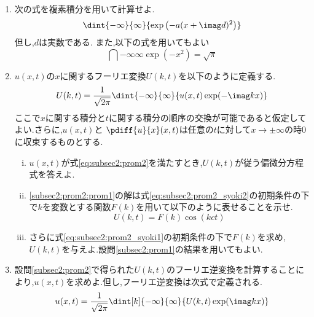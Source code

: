 \documentclass[dvipdfmx,titlepage, 11pt, a4paper]{jsarticle}%
\begin{document}
\begin{enumerate}[(1)]
    \setlength{\itemsep}{10pt}
    \item 次の式を複素積分を用いて計算せよ.\label{subsec2:prom1}
    \begin{equation*}
        \dint{-\infty}{\infty}{\exp\left(-a(x + \imag d)^{2}\right)}
    \end{equation*}
    但し,$d$は実数である.
    また,以下の式を用いてもよい
    \begin{equation*}
        \dint{-\infty}{\infty}{\exp\left(-x^2\right)} = \sqrt{\pi}
    \end{equation*}
    \item $u(x, t)$の$x$に関するフーリエ変換$U(k, t)$を以下のように定義する.\label{subsec2:prom2}
    \begin{equation*}
        U(k, t) = \frac{1}{\sqrt{2\pi}}\dint{-\infty}{\infty}{u(x, t)\exp(-\imag kx)}
    \end{equation*}
    ここで$x$に関する積分と$t$に関する積分の順序の交換が可能であると仮定してよい.さらに,$u(x, t)$と
    $\pdiff{u}{x}(x, t)$は任意の$t$に対して$x \rightarrow\pm\infty$の時0に収束するものとする.
    \begin{enumerate}[(i)]
        \setlength{\itemsep}{10pt}
        \item $u(x, t)$が式\eqref{eq:subsec2:prom2}を満たすとき,$U(k, t)$が従う偏微分方程式を答えよ.\label{subsec2:prom2:prom1}
        \item \eqref{subsec2:prom2:prom1}の解は式\eqref{eq:subsec2:prom2_syoki2}の初期条件の下で$k$を変数とする関数$F(k)$を用いて以下のように表せることを示せ.\label{subsec2:prom2:prom2}
        \begin{equation*}
            U(k, t) = F(k)\cos(kct)
        \end{equation*}
        \item さらに式\eqref{eq:subsec2:prom2_syoki1}の初期条件の下で$F(k)$を求め,$U(k, t)$を与えよ.設問\eqref{subsec2:prom1}の結果を用いてもよい.\label{subsec2:prom2:prom3}
    \end{enumerate}
    \item 設問\ref{subsec2:prom2}で得られた$U(k, t)$のフーリエ逆変換を計算することにより,$u(x, t)$を求めよ.但し,フーリエ逆変換は次式で定義される.\label{subsec2:prom3}
    \begin{equation*}
        u(x, t) = \frac{1}{\sqrt{2\pi}}\dint[k]{-\infty}{\infty}{U(k, t)\exp(\imag kx)}
    \end{equation*}
\end{enumerate}
\end{document}

